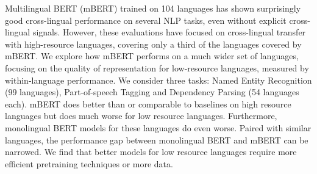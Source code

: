 Multilingual BERT (mBERT) trained on 104 languages has shown surprisingly good cross-lingual performance on several NLP tasks, even without explicit cross-lingual signals. However, these evaluations have focused on cross-lingual transfer with high-resource languages, covering only a third of the languages covered by mBERT. We explore how mBERT performs on a much wider set of languages, focusing on the quality of representation for low-resource languages, measured by within-language performance. We consider three tasks: Named Entity Recognition (99 languages), Part-of-speech Tagging and Dependency Parsing (54 languages each). mBERT does better than or comparable to baselines on high resource languages but does much worse for low resource languages. Furthermore, monolingual BERT models for these languages do even worse. Paired with similar languages, the performance gap between monolingual BERT and mBERT can be narrowed. We find that better models for low resource languages require more efficient pretraining techniques or more data.
